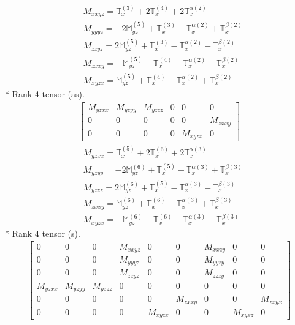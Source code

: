 \documentclass[fleqn,8pt,landscape]{jsarticle}
\begin{document}
\begin{align*}
& M_{xxyz} = \mathbb{T}_{x}^{(3)} + 2 \mathbb{T}_{x}^{(4)} + 2 \mathbb{T}_{x}^{\alpha(2)} \\
& M_{yyyz} = - 2 \mathbb{M}_{yz}^{(5)} + \mathbb{T}_{x}^{(3)} - \mathbb{T}_{x}^{\alpha(2)} + \mathbb{T}_{x}^{\beta(2)} \\
& M_{zzyz} = 2 \mathbb{M}_{yz}^{(5)} + \mathbb{T}_{x}^{(3)} - \mathbb{T}_{x}^{\alpha(2)} - \mathbb{T}_{x}^{\beta(2)} \\
& M_{zxxy} = - \mathbb{M}_{yz}^{(5)} + \mathbb{T}_{x}^{(4)} - \mathbb{T}_{x}^{\alpha(2)} - \mathbb{T}_{x}^{\beta(2)} \\
& M_{xyzx} = \mathbb{M}_{yz}^{(5)} + \mathbb{T}_{x}^{(4)} - \mathbb{T}_{x}^{\alpha(2)} + \mathbb{T}_{x}^{\beta(2)}
\end{align*}
* Rank 4 tensor (as).
\begin{align*}
\begin{bmatrix} M_{yzxx} & M_{yzyy} & M_{yzzz} & 0 & 0 & 0 \\ 0 & 0 & 0 & 0 & 0 & M_{zxxy} \\ 0 & 0 & 0 & 0 & M_{xyzx} & 0 \end{bmatrix}
\end{align*}
\begin{align*}
& M_{yzxx} = \mathbb{T}_{x}^{(5)} + 2 \mathbb{T}_{x}^{(6)} + 2 \mathbb{T}_{x}^{\alpha(3)} \\
& M_{yzyy} = - 2 \mathbb{M}_{yz}^{(6)} + \mathbb{T}_{x}^{(5)} - \mathbb{T}_{x}^{\alpha(3)} + \mathbb{T}_{x}^{\beta(3)} \\
& M_{yzzz} = 2 \mathbb{M}_{yz}^{(6)} + \mathbb{T}_{x}^{(5)} - \mathbb{T}_{x}^{\alpha(3)} - \mathbb{T}_{x}^{\beta(3)} \\
& M_{zxxy} = \mathbb{M}_{yz}^{(6)} + \mathbb{T}_{x}^{(6)} - \mathbb{T}_{x}^{\alpha(3)} + \mathbb{T}_{x}^{\beta(3)} \\
& M_{xyzx} = - \mathbb{M}_{yz}^{(6)} + \mathbb{T}_{x}^{(6)} - \mathbb{T}_{x}^{\alpha(3)} - \mathbb{T}_{x}^{\beta(3)}
\end{align*}
* Rank 4 tensor (s).
\begin{align*}
\begin{bmatrix} 0 & 0 & 0 & M_{xxyz} & 0 & 0 & M_{xxzy} & 0 & 0 \\ 0 & 0 & 0 & M_{yyyz} & 0 & 0 & M_{yyzy} & 0 & 0 \\ 0 & 0 & 0 & M_{zzyz} & 0 & 0 & M_{zzzy} & 0 & 0 \\ M_{yzxx} & M_{yzyy} & M_{yzzz} & 0 & 0 & 0 & 0 & 0 & 0 \\ 0 & 0 & 0 & 0 & 0 & M_{zxxy} & 0 & 0 & M_{zxyx} \\ 0 & 0 & 0 & 0 & M_{xyzx} & 0 & 0 & M_{xyxz} & 0 \end{bmatrix}
\end{align*}
\end{document}
